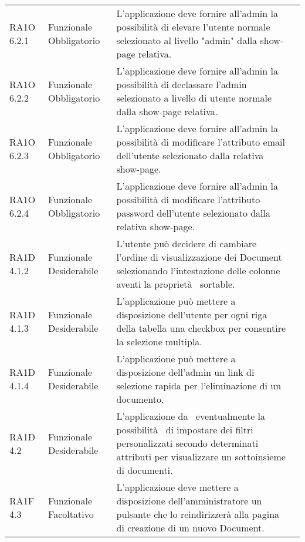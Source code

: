 \begin{center}
\begin{longtable}{ | p{2cm} | p{2cm} | p{5cm} | p{2cm} |}
 &  \\ \hline      
        RA1O 6.2.1 & Funzionale \newline  Obbligatorio  & L'applicazione deve fornire all'admin la possibilità di elevare l'utente normale selezionato al livello "admin" dalla show-page relativa. &  \\ \hline      
        RA1O 6.2.2 & Funzionale \newline  Obbligatorio  & L'applicazione deve fornire all'admin la possibilità di declassare l'admin selezionato a livello di utente normale dalla show-page relativa. &  \\ \hline      
        RA1O 6.2.3 & Funzionale \newline  Obbligatorio  & L'applicazione deve fornire all'admin la possibilità di modificare l'attributo email dell'utente selezionato dalla relativa show-page. &  \\ \hline      
        RA1O 6.2.4 & Funzionale \newline  Obbligatorio  & L'applicazione deve fornire all'admin la possibilità di modificare l'attributo password dell'utente selezionato dalla relativa show-page. &  \\ \hline      
        RA1D 4.1.2  & Funzionale \newline  Desiderabile  & L'utente può decidere di cambiare l'ordine di visualizzazione dei Document selezionando l'intestazione delle colonne aventi la proprietà  sortable.
 &  \\ \hline      
        RA1D 4.1.3  & Funzionale \newline  Desiderabile  & L'applicazione può mettere a disposizione dell'utente per ogni riga della tabella una checkbox per consentire la selezione multipla.
 &  \\ \hline      
        RA1D 4.1.4  & Funzionale \newline  Desiderabile  & L'applicazione può mettere a disposizione dell'admin un link di selezione rapida per l'eliminazione di un documento.
 &  \\ \hline      
        RA1D 4.2  & Funzionale \newline  Desiderabile  & L'applicazione da  eventualmente la possibilità  di impostare dei filtri personalizzati secondo determinati attributi per visualizzare un sottoinsieme di documenti. &  \\ \hline      
        RA1F 4.3 & Funzionale \newline  Facoltativo  & L'applicazione deve mettere a disposizione dell'amministratore un pulsante che lo reindirizzerà alla pagina di creazione di un nuovo Document.
 &  \\ \hline
      \end{longtable}
      \end{center}  
\clearpage

